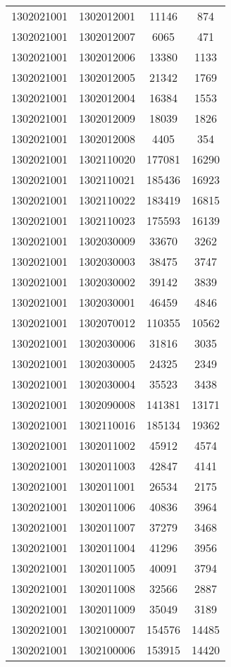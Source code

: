 \begin{longtable}[h]{llcc}
		1302021001 & 1302012001 & 11146 & 874\\
		1302021001 & 1302012007 & 6065 & 471\\
		1302021001 & 1302012006 & 13380 & 1133\\
		1302021001 & 1302012005 & 21342 & 1769\\
		1302021001 & 1302012004 & 16384 & 1553\\
		1302021001 & 1302012009 & 18039 & 1826\\
		1302021001 & 1302012008 & 4405 & 354\\
		1302021001 & 1302110020 & 177081 & 16290\\
		1302021001 & 1302110021 & 185436 & 16923\\
		1302021001 & 1302110022 & 183419 & 16815\\
		1302021001 & 1302110023 & 175593 & 16139\\
		1302021001 & 1302030009 & 33670 & 3262\\
		1302021001 & 1302030003 & 38475 & 3747\\
		1302021001 & 1302030002 & 39142 & 3839\\
		1302021001 & 1302030001 & 46459 & 4846\\
		1302021001 & 1302070012 & 110355 & 10562\\
		1302021001 & 1302030006 & 31816 & 3035\\
		1302021001 & 1302030005 & 24325 & 2349\\
		1302021001 & 1302030004 & 35523 & 3438\\
		1302021001 & 1302090008 & 141381 & 13171\\
		1302021001 & 1302110016 & 185134 & 19362\\
		1302021001 & 1302011002 & 45912 & 4574\\
		1302021001 & 1302011003 & 42847 & 4141\\
		1302021001 & 1302011001 & 26534 & 2175\\
		1302021001 & 1302011006 & 40836 & 3964\\
		1302021001 & 1302011007 & 37279 & 3468\\
		1302021001 & 1302011004 & 41296 & 3956\\
		1302021001 & 1302011005 & 40091 & 3794\\
		1302021001 & 1302011008 & 32566 & 2887\\
		1302021001 & 1302011009 & 35049 & 3189\\
		1302021001 & 1302100007 & 154576 & 14485\\
		1302021001 & 1302100006 & 153915 & 14420\\

\end{longtable}
